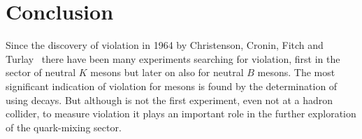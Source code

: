 
\chapter{Conclusion}
\label{sec:conclusion}

Since the discovery of \CP violation in 1964 by Christenson, Cronin, Fitch and
Turlay~\cite{CPV_discovery} there have been many experiments searching for \CP
violation, first in the sector of neutral $K$ mesons but later on also for
neutral $B$ mesons. The most significant indication of \CP violation for \Bz
mesons is found by the determination of \sintwobeta using \BdToJPsiKS decays.
But although \lhcb is not the first experiment, even not at a hadron collider,
to measure \CP violation it plays an important role in the further exploration
of the quark-mixing sector.

